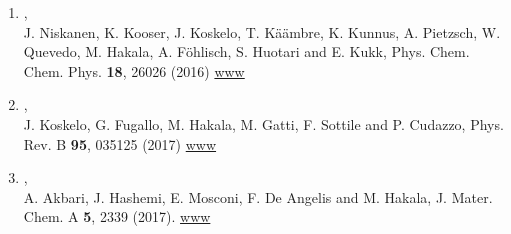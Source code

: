 \documentclass[12pt,a4]{report}
\begin{document}
\begin{enumerate}
\item{},\\
J. Niskanen, K. Kooser, J. Koskelo, T. K{\"a}{\"a}mbre, K. Kunnus, A. Pietzsch, W. Quevedo, M. Hakala, A. F{\"o}hlisch, S. Huotari and E. Kukk, Phys. Chem. Chem. Phys. {\bf 18}, 26026 (2016)
\href{http://pubs.rsc.org/en/Content/ArticleLanding/2016/CP/C6CP03220F#!divAbstract}{www}



\item{},\\
J. Koskelo, G. Fugallo, M. Hakala, M. Gatti, F. Sottile and P. Cudazzo, Phys. Rev. B {\bf 95}, 035125 (2017)
\href{http://journals.aps.org/prb/abstract/10.1103/PhysRevB.95.035125}{www}

\item{},\\
A. Akbari, J. Hashemi, E. Mosconi, F. De Angelis and M. Hakala, J. Mater. Chem. A {\bf 5}, 2339 (2017).
\href{http://pubs.rsc.org/en/content/articlelanding/2016/ta/c6ta08874k#!divAbstract}{www}







\end{enumerate}
\end{document}
